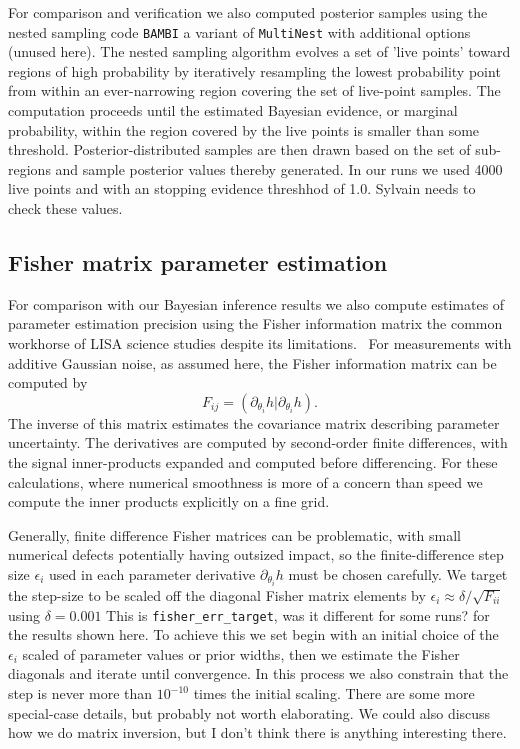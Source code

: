 \documentclass[aps,showpacs,twocolumn,prd,superscriptaddress,nofootinbib]{revtex4-1}
\newcommand{\be}{\begin{equation}}
\newcommand{\ee}{\end{equation}}
\newcommand{\jgb}[1]{{\color{DarkGreen} #1}}
\begin{document}
For comparison and verification we also computed posterior samples using the nested sampling code \texttt{BAMBI}\cite{Graff+2012} a variant of \texttt{MultiNest}\cite{Feroz+2009b} with additional options (unused here).  The nested sampling algorithm evolves a set of 'live points' toward regions of high probability by iteratively resampling the lowest probability point from within an ever-narrowing region covering the set of live-point samples.  The computation proceeds until the estimated Bayesian evidence, or marginal probability, within the region covered by the live points is smaller than some threshold.  Posterior-distributed samples are then drawn based on the set of sub-regions and sample posterior values thereby generated. In our runs we used 4000 live points and with an stopping evidence threshhod of 1.0. \jgb{Sylvain needs to check these values.}




\subsection{Fisher matrix parameter estimation}
\label{sec:Fisher}

For comparison with our Bayesian inference results we also compute estimates of parameter estimation precision using the Fisher information matrix the common workhorse of LISA science studies despite its limitations.~\cite{Vallisneri08}  For measurements with additive Gaussian noise, as assumed here, the Fisher information matrix can be computed by
\be
F_{ij}=\left( \partial_{\theta_i} h| \partial_{\theta_i} h \right).
\ee
The inverse of this matrix estimates the covariance matrix describing parameter uncertainty. 
The derivatives are computed by second-order finite differences, with the signal inner-products expanded and computed before differencing. For these calculations, where numerical smoothness is more of a concern than speed we compute the inner products explicitly on a fine grid.

Generally, finite difference Fisher matrices can be problematic, with small numerical defects potentially having outsized impact, so the finite-difference step size $\epsilon_i$ used in each parameter derivative $\partial_{\theta_i}h$ must be chosen carefully. We target the step-size to be scaled off the diagonal Fisher matrix elements by ${\epsilon_i}\approx\delta/\sqrt{F_{ii}}$ using $\delta=0.001$ \jgb{This is \texttt{fisher\_err\_target}, was it different for some runs?}  for the results shown here.  To achieve this we set begin with an initial choice of the $\epsilon_i$ scaled of parameter values or prior widths, then we estimate the Fisher diagonals and iterate until convergence. In this process we also constrain that the step is never more than $10^{-10}$ times the initial scaling. \jgb{There are some more special-case details, but probably not worth elaborating.  We could also discuss how we do matrix inversion, but I don't think there is anything interesting there.}
\end{document}
